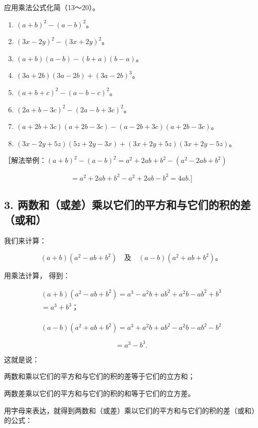 应用乘法公式化简（13～20）。

\begin{enumerate}[start=13]
\item
  \((a + b)^2 - (a - b)^2\)。
\item
  \((3x - 2y)^{2} - (3x + 2y)^{2}\)。
\item
  \((a + b)(a - b) - (b + a)(b - a)\)。
\item
  \((3a + 2b)(3a - 2b) + (3a - 2b)^{3}\)。
\item
  \((a + b + c)^2 - (a - b - c)^2\)。
\item
  \((2a + b - 3c)^{2} - (2a - b + 3c)^{2}\)。
\item
  \((a + 2b + 3c)(a + 2b - 3c) - (a - 2b + 3c)(a + 2b - 3c)\)。
\item
  \((3x - 2y + 5z)(5z + 2y - 3x) + (3x + 2y + 5z)(3x + 2y - 5z)\)。
\end{enumerate}

［解法举例：\((a + b)^{2} - (a - b)^{2} = a^{2} + 2ab + b^{2} - (a^{2} - 2ab + b^{2})\)

\[
= a ^{2} + 2 a b + b ^{2} - a ^{2} + 2 a b - b ^{2} = 4 a b. ]
\]

\subsection{3. 两数和（或差）乘以它们的平方和与它们的积的差（或和）}

我们来计算：

\[
(a + b) (a ^{2} - a b + b ^{2}) \quad \text{及} \quad (a - b) (a ^{2} + a b + b ^{2})\text{。}
\]

用乘法计算， 得到：

\[
\begin{array}{l} (a + b) \left(a ^{2} - a b + b ^{2}\right) = a ^{3} - a ^{2} b + a b ^{2} + a ^{2} b - a b ^{2} + b ^{3} \\ = a ^{3} + b ^{3}\text{；} \\ \end{array}
\]

\[
(a - b) \left(a ^{2} + a b + b ^{2}\right) = a ^{3} + a ^{2} b + a b ^{2} - a ^{2} b - a b ^{2} - b ^{2}
\]

\[
= a ^{3} - b ^{3}.
\]

这就是说：

两数和乘以它们的平方和与它们的积的差等于它们的立方和；

两数差乘以它们的平方和与它们的积的和等于它们的立方差。

用字母来表达，就得到两数和（或差）乘以它们的平方和与它们的积的差（或和）的公式：

